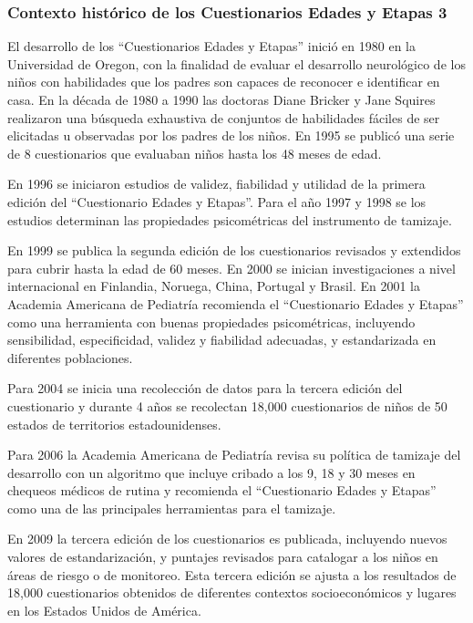 \documentclass[11pt,letterpaper]{report}
\begin{document}
\subsubsection{Contexto histórico de los Cuestionarios Edades y Etapas 3}
El desarrollo de los ``Cuestionarios Edades y Etapas'' inició en 1980 en la
Universidad de Oregon, con la finalidad de evaluar el desarrollo neurológico de
los niños con habilidades que los padres son capaces de reconocer e identificar
en casa. En la década de 1980 a 1990 las doctoras Diane Bricker y Jane Squires
realizaron una búsqueda exhaustiva de conjuntos de habilidades fáciles de ser
elicitadas u observadas por los padres de los niños. En 1995 se publicó una
serie de 8 cuestionarios que evaluaban niños hasta los 48 meses de edad.
\cite{ASQ4decades}

En 1996 se iniciaron estudios de validez, fiabilidad y utilidad de la primera
edición del ``Cuestionario Edades y Etapas''. Para el año 1997 y 1998 se los
estudios determinan las propiedades psicométricas del instrumento de tamizaje.
\cite{ASQ4decades}

En 1999 se publica la segunda edición de los cuestionarios revisados y
extendidos para cubrir hasta la edad de 60 meses. En 2000 se inician
investigaciones a nivel internacional en Finlandia, Noruega, China, Portugal y
Brasil. En 2001 la Academia Americana de Pediatría recomienda el ``Cuestionario
Edades y Etapas'' como una herramienta con buenas propiedades psicométricas,
incluyendo sensibilidad, especificidad, validez y fiabilidad adecuadas, y
estandarizada en diferentes poblaciones. \cite{Pediatrics2001}

Para 2004 se inicia una recolección de datos para la tercera edición del
cuestionario y durante 4 años se recolectan 18,000 cuestionarios de niños de 50
estados de territorios estadounidenses. \cite{ASQ4decades}

Para 2006 la Academia Americana de Pediatría revisa su política de tamizaje del
desarrollo con un algoritmo que incluye cribado a los 9, 18 y 30 meses en
chequeos médicos de rutina y recomienda el ``Cuestionario Edades y Etapas''
como una de las principales herramientas para el tamizaje.
\cite{Pediatrics2006}
 
En 2009 la tercera edición de los cuestionarios es publicada, incluyendo nuevos
valores de estandarización, y puntajes revisados para catalogar a los niños en
áreas de riesgo o de monitoreo. Esta tercera edición se ajusta a los resultados
de 18,000 cuestionarios obtenidos de diferentes contextos socioeconómicos y
lugares en los Estados Unidos de América. \cite{ASQ4decades}
\end{document}
